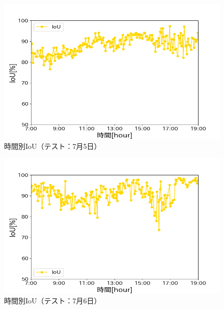 \begin{figure}[ht] 
  \begin{center}
    \includegraphics[width=\linewidth]{image/0705_IoU_kousa.png}
  \end{center}
  \caption{時間別IoU（テスト：7月5日）}
  \label{kousa_IoU_0705}
\end{figure}

\begin{figure}[ht] 
  \begin{center}
    \includegraphics[width=\linewidth]{image/0706_IoU_kousa.png}
  \end{center}
  \caption{時間別IoU（テスト：7月6日）}
  \label{kousa_IoU_0706}
\end{figure}

